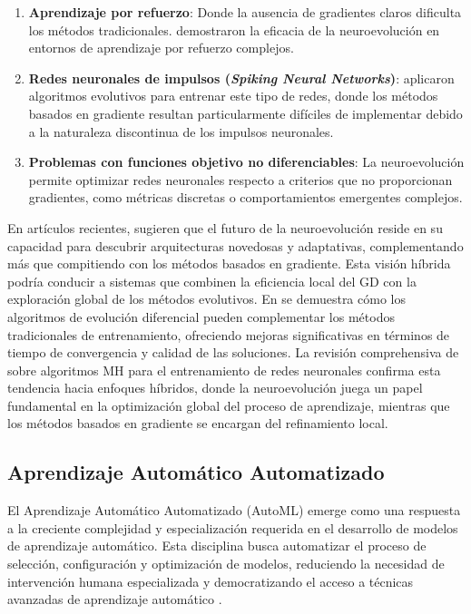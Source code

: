 \begin{enumerate}
    \item \textbf{Aprendizaje por refuerzo}: Donde la ausencia de gradientes claros dificulta los métodos tradicionales. \cite{Miikkulainen2019} demostraron la eficacia de la neuroevolución en entornos de aprendizaje por refuerzo complejos.

    \item \textbf{Redes neuronales de impulsos (\textit{Spiking Neural Networks})}: \cite{Pavlidis2005} aplicaron algoritmos evolutivos para entrenar este tipo de redes, donde los métodos basados en gradiente resultan particularmente difíciles de implementar debido a la naturaleza discontinua de los impulsos neuronales.

    \item \textbf{Problemas con funciones objetivo no diferenciables}: La neuroevolución permite optimizar redes neuronales respecto a criterios que no proporcionan gradientes, como métricas discretas o comportamientos emergentes complejos.
\end{enumerate}


En artículos recientes, \cite{Stanley2019} sugieren que el futuro de la neuroevolución reside en su capacidad para descubrir arquitecturas novedosas y adaptativas, complementando más que compitiendo con los métodos basados en gradiente. Esta visión híbrida podría conducir a sistemas que combinen la eficiencia local del GD con la exploración global de los métodos evolutivos. En \cite{Slowik2008} se demuestra cómo los algoritmos de evolución diferencial pueden complementar los métodos tradicionales de entrenamiento, ofreciendo mejoras significativas en términos de tiempo de convergencia y calidad de las soluciones. La revisión comprehensiva de \cite{Kaveh2023} sobre algoritmos MH para el entrenamiento de redes neuronales confirma esta tendencia hacia enfoques híbridos, donde la neuroevolución juega un papel fundamental en la optimización global del proceso de aprendizaje, mientras que los métodos basados en gradiente se encargan del refinamiento local.



\subsection{Aprendizaje Automático Automatizado}

El Aprendizaje Automático Automatizado (AutoML) emerge como una respuesta a la creciente complejidad y especialización requerida en el desarrollo de modelos de aprendizaje automático. Esta disciplina busca automatizar el proceso de selección, configuración y optimización de modelos, reduciendo la necesidad de intervención humana especializada y democratizando el acceso a técnicas avanzadas de aprendizaje automático \cite{Hutter2019}.

